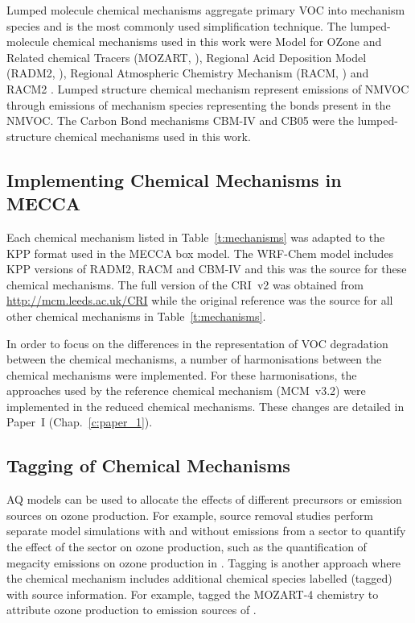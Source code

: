 Lumped molecule chemical mechanisms aggregate primary VOC into mechanism species and is the most commonly used simplification technique.
The lumped-molecule chemical mechanisms used in this work were Model for OZone and Related chemical Tracers (MOZART, \citet{Emmons:2010}), Regional Acid Deposition Model (RADM2, \citet{Stockwell:1990}), Regional Atmospheric Chemistry Mechanism (RACM, \citet{Stockwell:1997}) and RACM2 \citet{Goliff:2013}.
Lumped structure chemical mechanism represent emissions of NMVOC through emissions of mechanism species representing the bonds present in the NMVOC.
The Carbon Bond mechanisms CBM-IV \citep{Gery:1989} and CB05 \citep{Yarwood:2005} were the lumped-structure chemical mechanisms used in this work.

\newpage
\subsection{Implementing Chemical Mechanisms in MECCA} \label{s:mechanisms_MECCA}
Each chemical mechanism listed in Table~\ref{t:mechanisms} was adapted to the KPP format used in the MECCA box model.
The WRF-Chem model \citep{Grell:2005} includes KPP versions of RADM2, RACM and CBM-IV and this was the source for these chemical mechanisms.
The full version of the CRI~v2 was obtained from \mbox{\url{http://mcm.leeds.ac.uk/CRI}} while the original reference was the source for all other chemical mechanisms in Table~\ref{t:mechanisms}.

In order to focus on the differences in the representation of VOC degradation between the chemical mechanisms, a number of harmonisations between the chemical mechanisms were implemented.
For these harmonisations, the approaches used by the reference chemical mechanism (MCM~v3.2) were implemented in the reduced chemical mechanisms.
These changes are detailed in Paper~I (Chap.~\ref{c:paper_1}). 

\subsection{Tagging of Chemical Mechanisms} \label{s:tagging}
AQ models can be used to allocate the effects of different precursors or emission sources on ozone production.
For example, source removal studies perform separate model simulations with and without emissions from a sector to quantify the effect of the sector on ozone production, such as the quantification of megacity emissions on ozone production in \citet{Butler:2009}.
Tagging is another approach where the chemical mechanism includes additional chemical species labelled (tagged) with source information.
For example, \citet{Emmons:2012} tagged the MOZART-4 chemistry to attribute ozone production to emission sources of .

